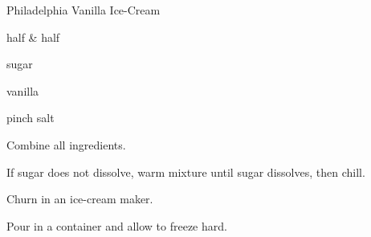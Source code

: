 \begin{recipe}{Philadelphia Vanilla Ice-Cream}{}{}

\begin{ingredients}
\item {} half \& half 
\item \C{\threequarter} sugar
\item {} vanilla
\item pinch salt
\end{ingredients}

\begin{directions}
\item Combine all ingredients.
\item If sugar does not dissolve, warm mixture until sugar dissolves, then chill.
\item Churn in an ice-cream maker.
\item Pour in a container and allow to freeze hard.
\end{directions}

\end{recipe}
